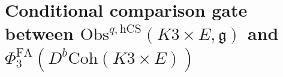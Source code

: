 %

\providecommand{\C}{\mathbb C}
\providecommand{\R}{\mathbb R}
\providecommand{\Q}{\mathbb Q}
\providecommand{\Z}{\mathbb Z}
\providecommand{\bL}{\mathbf L}
\providecommand{\bS}{\mathbf S}
\providecommand{\cC}{\mathcal C}
\providecommand{\cF}{\mathcal F}
\providecommand{\cK}{\mathcal K}
\providecommand{\cM}{\mathcal M}
\providecommand{\cO}{\mathcal O}
\providecommand{\frakg}{\mathfrak g}
\providecommand{\HH}{\mathrm{HH}}
\providecommand{\End}{\mathrm{End}}
\providecommand{\Coh}{\mathrm{Coh}}
\providecommand{\Perf}{\mathrm{Perf}}
\providecommand{\Obs}{\mathrm{Obs}}
\providecommand{\hCS}{\mathrm{hCS}}
\providecommand{\hol}{\mathrm{hol}}
\providecommand{\BCOV}{\mathrm{BCOV}}
\providecommand{\PV}{\mathrm{PV}}
\providecommand{\PhiFA}{\Phi^{\mathrm{FA}}}
\providecommand{\Ethree}{E_3}
\providecommand{\Etwo}{E_2}
\providecommand{\Eone}{E_1}
\providecommand{\En}{E_n}
\providecommand{\Ed}{E_d}
\providecommand{\EdHolFA}{\Ed\text{-}\mathrm{HolFA}}
\providecommand{\kch}{\kappa_{\mathrm{ch}}}
\providecommand{\kcat}{\kappa_{\mathrm{cat}}}
\providecommand{\kBKM}{\kappa_{\mathrm{BKM}}}
\providecommand{\Conf}{\mathrm{Conf}}
\providecommand{\GRT}{\mathrm{GRT}}

\providecommand{\ClaimStatusVerified}{\textbf{[verified]}}
\providecommand{\ClaimStatusDerivation}{\textbf{[derivation]}}
\providecommand{\ClaimStatusOpen}{\textbf{[open]}}
\providecommand{\ClaimStatusProvedHere}[1][]{\textbf{[proved here#1]}}
\providecommand{\ClaimStatusConditional}[1][]{\textbf{[conditional#1]}}

\section*{Conditional comparison gate between $\Obs^{q,\hCS}(K3 \times E,\frakg)$ and
\texorpdfstring{$\PhiFA_3(D^b\Coh(K3\times E))$}{PhiFA3(DbCoh(K3xE))}}
\label{sec:swarm-blocker6-agent06-categorical-identification}

